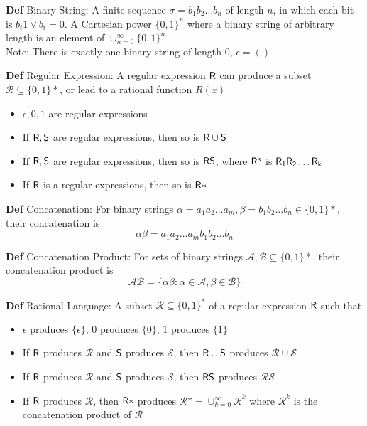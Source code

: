 \documentclass[11pt,notitlepage]{report}
\newcommand{\mc}[1]{\ensuremath{\mathcal{#1}}}
\newcommand{\tbf}[1]{\textbf{#1}}
\begin{document}
\tbf{Def} Binary String: A finite sequence $\sigma = b_1b_2\dots b_n$ of length $n$, in which each bit is $b_i 1 \vee b_i = 0$. A Cartesian power $\{0,1\}^n$ where a binary string of arbitrary length is an element of $\cup^\infty_{n=0}\{0, 1\}^n$\\
\hspace*{5mm} Note: There is exactly one binary string of length $0$, $\epsilon = ()$

\tbf{Def} Regular Expression: A regular expression $\sf R$ can produce a subset $\mc R \subseteq \{0, 1\}*$, or lead to a rational function $R(x)$
\vspace{-4mm}
\begin{itemize}
    \item $\epsilon, 0, 1$ are regular expressions
    \item If $\sf R, \sf S$ are regular expressions, then so is $\sf R \cup \sf S$
    \item If $\sf R, \sf S$ are regular expressions, then so is $\sf R \sf S$, where $\sf R^k$ is $\sf R_1 \sf R_2 \dots \sf R_k$
    \item If $\sf R$ is a regular expressions, then so is $\sf R*$
\end{itemize}

\tbf{Def} Concatenation: For binary strings $\alpha = a_1a_2\dots a_m, \beta = b_1b_2\dots b_n \in \{0, 1\}*$, their concatenation is
$$\alpha\beta = a_1a_2\dots a_mb_1b_2 \dots b_n$$

\tbf{Def} Concatenation Product: For sets of binary strings $\mc A, \mc B \subseteq \{0, 1\}*$, their concatenation product is
$$\mc A\mc B = \{\alpha\beta : \alpha \in \mc A, \beta \in \mc B\}$$

\tbf{Def} Rational Language: A subset $\mc R \subseteq \{0, 1\}^*$ of a regular expression $\sf R$ such that
\vspace{-4mm}
\begin{itemize}
    \item $\epsilon$ produces $\{\epsilon\}$, $0$ produces $\{0\}$, $1$ produces $\{1\}$
    \item If $\sf R$ produces $\mc R$ and $\sf S$ produces $\mc S$, then $\sf R \cup \sf S$ produces $\mc R \cup \mc S$
    \item If $\sf R$ produces $\mc R$ and $\sf S$ produces $\mc S$, then $\sf R \sf S$ produces $\mc R \mc S$
    \item If $\sf R$ produces $\mc R$, then $\sf R*$ produces $\mc R* = \cup_{k=0}^\infty \mc R^k$ where $\mc R^k$ is the concatenation product of $\mc R$
\end{itemize}
\end{document}
